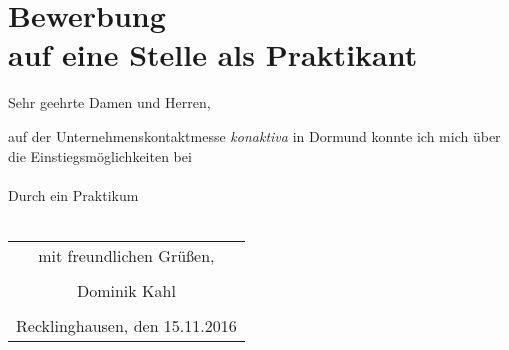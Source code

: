 \documentclass{scrartcl}
\begin{document}
\pagestyle{empty}

\section*{Bewerbung \\
auf eine Stelle als Praktikant}

\vspace{0.5in}

Sehr geehrte Damen und Herren,
\newline

auf der Unternehmenskontaktmesse \textit{konaktiva} in Dormund konnte 
ich mich über die Einstiegsmöglichkeiten bei 
\\


\\

Durch ein Praktikum
\\\\


\begin{flushright}
\begin{tabular}{c}
mit freundlichen Grüßen, \\ \\
Dominik Kahl \\ \\
Recklinghausen, den 15.11.2016 \\
\end{tabular}
\end{flushright}
\end{document}
